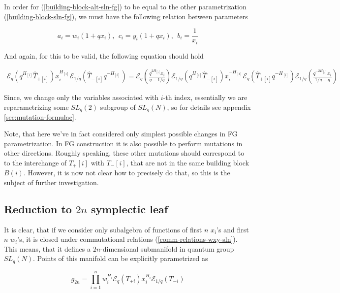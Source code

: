 \documentclass{article}
\newcommand{\lb}{\left (}
\newcommand{\rb}{\right )}
\newcommand{\B}[1]{\lb #1 \rb}
\newcommand{\lsb}{\left [}
\newcommand{\rsb}{\right ]}
\newcommand{\SB}[1]{\lsb #1 \rsb}
\newcommand {\?}{\textit{???}}
\newcommand{\me}[0]{\mathcal{E}}
\newcommand{\hT}[0]{\hat{T}}
\newcommand{\Tp}[1][]{T_{+ #1}}
\newcommand{\Tm}[1][]{T_{- #1}}
\newcommand{\delabel}[1]{(\ref{#1})}
\begin{document}
In order for \delabel{building-block-alt-sln-fg} to be equal to the other parametrization
 \delabel{building-block-sln-fg}, we must have the following relation between parameters

\begin{equation}
a_i = w_i (1 + q x_i),\ \ c_i = y_i ( 1 + q x_i), \ \ b_i = \frac{1}{x_i}
\end{equation}

And again, for this to be valid, the following equation should hold

\begin{align}
\label{mutation-sln-main-equation}
\me_q(q^{H_{\SB{i}}} \hT_{+ \SB{i}})
x_i^{H_{\SB{i}}}
\me_{1/q}(\hT_{- \SB{i}} q^{-H_{\SB{i}}})
= \me_q\lb \frac{q^{2H_{\SB{i}}} x_i}{q - 1/q}\rb \me_{1/q}(q^{H_{\SB{i}}} \hT_{-\SB{i}})
x_i^{-H_{\SB{i}}}
\me_{q}(\hT_{+ \SB{i}} q^{-H_{\SB{i}}}) \me_{1/q}\lb \frac{q^{-2H_{\SB{i}}} x_i}{1/q - q}\rb
\end{align}

Since, we change only the variables associated with $i$-th index,
 essentially we are reparametrizing some $SL_q(2)$ subgroup of $SL_q(N)$,
so for details see appendix \ref{sec:mutation-formulae}.


Note, that here we've in fact considered only simplest possible changes
in FG parametrization. In FG construction it is also possible to perform mutations
in other directions. Roughly speaking, these other mutations should correspond to
to the interchange of $\Tp{\SB{i}}$ with $\Tm{\SB{i}}$, that are not in the same building block $B(i)$.
 However, it is now not clear how to precisely do that, so this is the subject of
further investigation.


\subsection{Reduction to $2n$ symplectic leaf}

It is clear, that if we consider only subalgebra of functions of first $n$ $x_i$'s and first $n$ $w_i$'s,
it is closed under commutational relations \delabel{comm-relations-wxy-sln}. This means,
that it defines a $2n$-dimensional submanifold in quantum group $SL_q(N)$.
Points of this manifold can be explicitly parametrized as

\begin{equation}
g_{2n} = \prod_{i = 1}^n w_i^{H_{i}} \me_q \B{\Tp[i]} x_i^{H_{i}} \me_{1/q} \B{\Tm[i]}
\end{equation}
\end{document}
